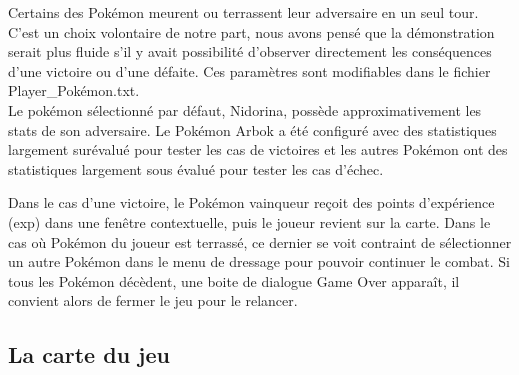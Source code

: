 Certains des Pokémon meurent ou terrassent leur adversaire en un seul tour. C'est un choix volontaire de notre part, nous avons pensé que la démonstration serait plus fluide s'il y avait possibilité d'observer directement les conséquences d'une victoire ou d'une défaite. Ces paramètres sont modifiables dans le fichier Player\_Pokémon.txt.\\

Le pokémon sélectionné par défaut, Nidorina, possède approximativement les stats de son adversaire. Le Pokémon Arbok a été configuré avec des statistiques largement surévalué pour tester les cas de victoires et les autres Pokémon ont des statistiques largement sous évalué pour tester les cas d'échec.  

Dans le cas d'une victoire, le Pokémon vainqueur reçoit des points d'expérience (exp) dans une fenêtre contextuelle, puis le joueur revient sur la carte. Dans le cas où Pokémon du joueur est terrassé, ce dernier se voit contraint de sélectionner un autre Pokémon dans le menu de dressage pour pouvoir continuer le combat. Si tous les Pokémon décèdent, une boite de dialogue Game Over apparaît, il convient alors de fermer le jeu pour le relancer.

\subsection{La carte du jeu}

